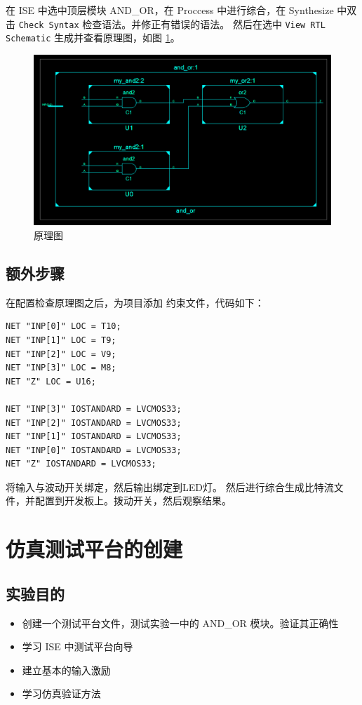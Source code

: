 \documentclass{ctexart}
\begin{document}
在 ISE 中选中顶层模块 AND\_OR，在 Proccess 中进行综合，在 Synthesize 中双击 
\verb|Check Syntax| 检查语法。并修正有错误的语法。
然后在选中 \verb|View RTL Schematic| 生成并查看原理图，如图 \ref{fig:homework2-3}。

\begin{figure}
\centering
\includegraphics[width=1\linewidth]{homework2-3}
\caption{原理图}
\label{fig:homework2-3}
\end{figure}



\subsection{额外步骤}

在配置检查原理图之后，为项目添加 约束文件，代码如下：
\begin{lstlisting}
NET "INP[0]" LOC = T10;
NET "INP[1]" LOC = T9;
NET "INP[2]" LOC = V9;
NET "INP[3]" LOC = M8;
NET "Z" LOC = U16;

NET "INP[3]" IOSTANDARD = LVCMOS33;
NET "INP[2]" IOSTANDARD = LVCMOS33;
NET "INP[1]" IOSTANDARD = LVCMOS33;
NET "INP[0]" IOSTANDARD = LVCMOS33;
NET "Z" IOSTANDARD = LVCMOS33;
\end{lstlisting}

将输入与波动开关绑定，然后输出绑定到LED灯。
然后进行综合生成比特流文件，并配置到开发板上。拨动开关，然后观察结果。

\section{仿真测试平台的创建}


\subsection{实验目的}
\begin{itemize}
    \item 创建一个测试平台文件，测试实验一中的 AND\_OR 模块。验证其正确性
    \item 学习 ISE 中测试平台向导
    \item 建立基本的输入激励
    \item 学习仿真验证方法
\end{itemize}
\end{document}

